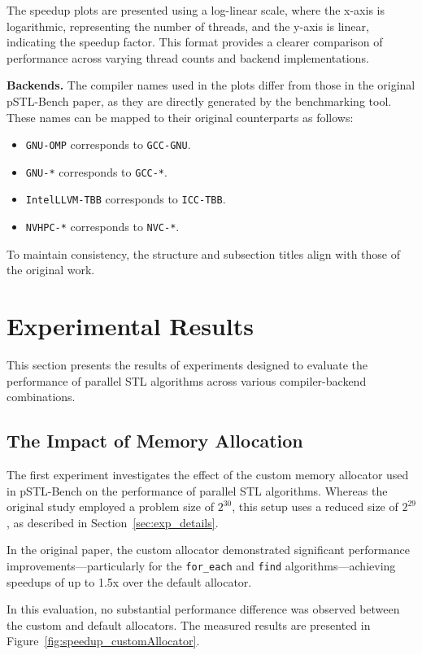 \documentclass[sigconf]{acmart}
\newcommand{\mypar}[1]{{\bf #1.}}
\begin{document}
The speedup plots are presented using a log-linear scale, where the x-axis is
logarithmic, representing the number of threads, and the y-axis is linear,
indicating the speedup factor. This format provides a clearer comparison of
performance across varying thread counts and backend implementations.

\mypar{Backends} The compiler names used in the plots differ from those in the original
pSTL-Bench paper, as they are directly generated by the benchmarking tool.
These names can be mapped to their original counterparts as follows:
\begin{itemize}
      \item \texttt{GNU-OMP} corresponds to \texttt{GCC-GNU}.
      \item \texttt{GNU-*} corresponds to \texttt{GCC-*}.
      \item \texttt{IntelLLVM-TBB} corresponds to \texttt{ICC-TBB}.
      \item \texttt{NVHPC-*} corresponds to \texttt{NVC-*}.
\end{itemize}

To maintain consistency, the structure and subsection titles align with those
of the original work.

\section{Experimental Results}

This section presents the results of experiments designed to evaluate the
performance of parallel STL algorithms across various compiler-backend
combinations.

\subsection{The Impact of Memory Allocation}

The first experiment investigates the effect of the custom memory allocator
used in pSTL-Bench on the performance of parallel STL algorithms. Whereas the
original study employed a problem size of $2^{30}$, this setup uses a reduced
size of $2^{29}$, as described in Section~\ref{sec:exp_details}.

In the original paper, the custom allocator demonstrated significant
performance improvements—particularly for the \texttt{for\_each} and
\texttt{find} algorithms—achieving speedups of up to 1.5x over the default
allocator.

In this evaluation, no substantial performance difference was observed between
the custom and default allocators. The measured results are presented in
Figure~\ref{fig:speedup_customAllocator}.
\end{document}
